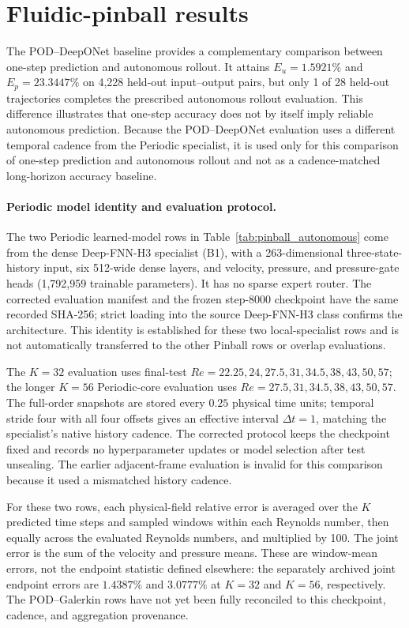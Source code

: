 \section{Fluidic-pinball results}
\label{app:pinball}

The POD--DeepONet baseline provides a complementary comparison between
one-step prediction and autonomous rollout. It attains $E_u=1.5921\%$ and $E_p=23.3447\%$ on 4,228 held-out input--output pairs, but only 1 of 28 held-out trajectories completes the prescribed autonomous rollout evaluation. This difference illustrates that one-step accuracy does not by itself imply reliable autonomous prediction. Because the POD--DeepONet evaluation uses a different temporal cadence from
the Periodic specialist, it is used only for this comparison of one-step prediction and autonomous rollout and not as a cadence-matched long-horizon accuracy baseline.

\paragraph{Periodic model identity and evaluation protocol.}
The two Periodic learned-model rows in Table~\ref{tab:pinball_autonomous} come from the dense Deep-FNN-H3 specialist (B1), with a 263-dimensional three-state-history input, six 512-wide dense layers, and velocity, pressure, and pressure-gate heads (1,792,959 trainable parameters). It has no sparse expert router. The corrected evaluation manifest and the frozen step-8000 checkpoint have the same recorded SHA-256; strict loading into the source Deep-FNN-H3 class confirms the architecture. This identity is established for these two local-specialist rows and is not automatically transferred to the other Pinball rows or overlap evaluations.

The $K=32$ evaluation uses final-test $Re=22.25,24,27.5,31,34.5,38,43,50,57$; the longer $K=56$ Periodic-core evaluation uses $Re=27.5,31,34.5,38,43,50,57$. The full-order snapshots are stored every $0.25$ physical time units; temporal stride four with all four offsets gives an effective interval $\Delta t=1$, matching the specialist's native history cadence. The corrected protocol keeps the checkpoint fixed and records no hyperparameter updates or model selection after test unsealing. The earlier adjacent-frame evaluation is invalid for this comparison because it used a mismatched history cadence.

For these two rows, each physical-field relative error is averaged over the $K$ predicted time steps and sampled windows within each Reynolds number, then equally across the evaluated Reynolds numbers, and multiplied by 100. The joint error is the sum of the velocity and pressure means. These are window-mean errors, not the endpoint statistic defined elsewhere: the separately archived joint endpoint errors are $1.4387\%$ and $3.0777\%$ at $K=32$ and $K=56$, respectively. The POD--Galerkin rows have not yet been fully reconciled to this checkpoint, cadence, and aggregation provenance.


